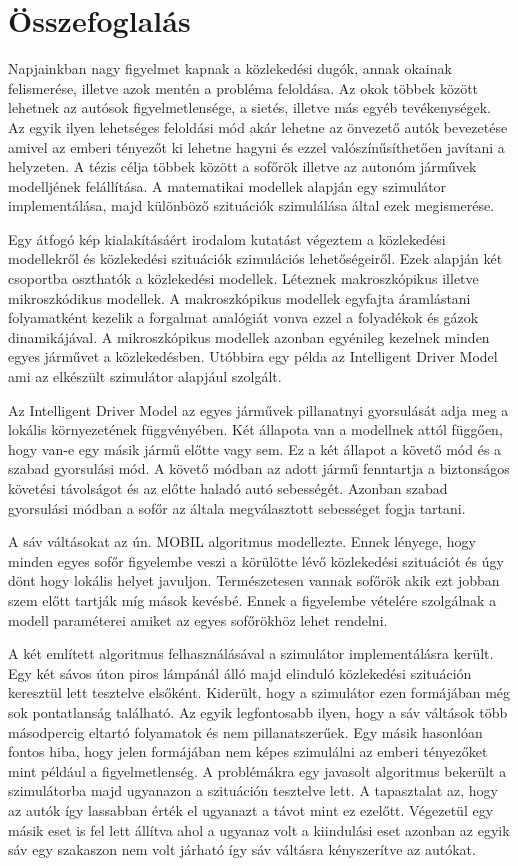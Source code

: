 \chapter*{Összefoglalás}
Napjainkban nagy figyelmet kapnak a közlekedési dugók, annak okainak felismerése, illetve azok mentén a probléma feloldása. Az okok többek között lehetnek az autósok figyelmetlensége, a sietés, illetve más egyéb tevékenységek. Az egyik ilyen lehetséges feloldási mód akár lehetne az önvezető autók bevezetése amivel az emberi tényezőt ki lehetne hagyni és ezzel valószínűsíthetően javítani a helyzeten. A tézis célja többek között a sofőrök illetve az autonóm járművek modelljének felállítása. A matematikai modellek alapján egy szimulátor implementálása, majd különböző szituációk szimulálása által ezek megismerése.

Egy átfogó kép kialakításáért irodalom kutatást végeztem a közlekedési modellekről és közlekedési szituációk szimulációs lehetőségeiről. Ezek alapján két csoportba oszthatók a közlekedési modellek. Léteznek makroszkópikus illetve mikroszkódikus modellek. A makroszkópikus modellek egyfajta áramlástani folyamatként kezelik a forgalmat analógiát vonva ezzel a folyadékok és gázok dinamikájával. A mikroszkópikus modellek azonban egyénileg kezelnek minden egyes járművet a közlekedésben. Utóbbira egy példa az Intelligent Driver Model ami az elkészült szimulátor alapjául szolgált.

Az Intelligent Driver Model az egyes járművek pillanatnyi gyorsulását adja meg a lokális környezetének függvényében. Két állapota van a modellnek attól függően, hogy van-e egy másik jármű előtte vagy sem. Ez a két állapot a követő mód és a szabad gyorsulási mód. A követő módban az adott jármű fenntartja a biztonságos követési távolságot és az előtte haladó autó sebességét. Azonban szabad gyorsulási módban a sofőr az általa megválasztott sebességet fogja tartani.

A sáv váltásokat az ún. MOBIL algoritmus modellezte. Ennek lényege, hogy minden egyes sofőr figyelembe veszi a körülötte lévő közlekedési szituációt és úgy dönt hogy lokális helyet javuljon. Természetesen vannak sofőrök akik ezt jobban szem előtt tartják míg mások kevésbé. Ennek a figyelembe vételére szolgálnak a modell paraméterei amiket az egyes sofőrökhöz lehet rendelni.

A két említett algoritmus felhasználásával a szimulátor implementálásra került. Egy két sávos úton piros lámpánál álló majd elinduló közlekedési szituáción keresztül lett tesztelve elsőként. Kiderült, hogy a szimulátor ezen formájában még sok pontatlanság található. Az egyik legfontosabb ilyen, hogy a sáv váltások több másodpercig eltartó folyamatok és nem pillanatszerűek. Egy másik hasonlóan fontos hiba, hogy jelen formájában nem képes szimulálni az emberi tényezőket mint például a figyelmetlenség. A problémákra egy javasolt algoritmus bekerült a szimulátorba majd ugyanazon a szituáción tesztelve lett. A tapasztalat az, hogy az autók így lassabban érték el ugyanazt a távot mint ez ezelőtt. Végezetül egy másik eset is fel lett állítva ahol a ugyanaz volt a kiindulási eset azonban az egyik sáv egy szakaszon nem volt járható így sáv váltásra kényszerítve az autókat.

